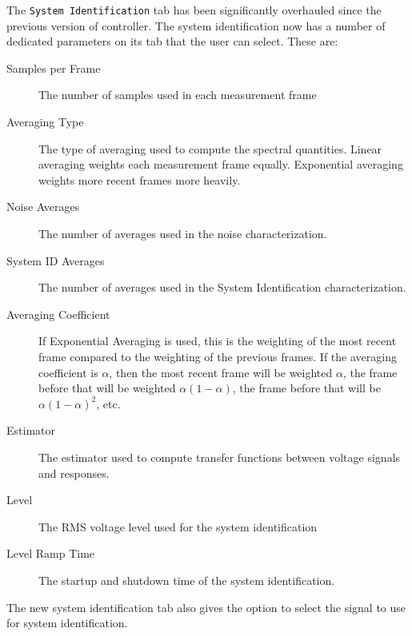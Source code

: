 \documentclass[pdf,12pt,report]{SANDreport}
\newcommand{\inlineCode}{\lstinline[basicstyle=\bfseries\ttfamily]}
\begin{document}
    The \inlineCode{System Identification} tab has been significantly overhauled since the previous version of controller.  The system identification now has a number of dedicated parameters on its tab that the user can select.  These are:
    
    \begin{description}
        \item[Samples per Frame] The number of samples used in each measurement frame
        \item[Averaging Type] The type of averaging used to compute the spectral quantities.  Linear averaging weights each measurement frame equally.  Exponential averaging weights more recent frames more heavily.
        \item[Noise Averages] The number of averages used in the noise characterization.
        \item[System ID Averages] The number of averages used in the System Identification characterization.
        \item[Averaging Coefficient] If Exponential Averaging is used, this is the weighting of the most recent frame compared to the weighting of the previous frames.  If the averaging coefficient is $\alpha$, then the most recent frame will be weighted $\alpha$, the frame before that will be weighted $\alpha(1-\alpha)$, the frame before that will be $\alpha(1-\alpha)^2$, etc.
        \item[Estimator] The estimator used to compute transfer functions between voltage signals and responses.
        \item[Level] The RMS voltage level used for the system identification
        \item[Level Ramp Time] The startup and shutdown time of the system identification.
    \end{description}

    The new system identification tab also gives the option to select the signal to use for system identification.
    
\end{document}
